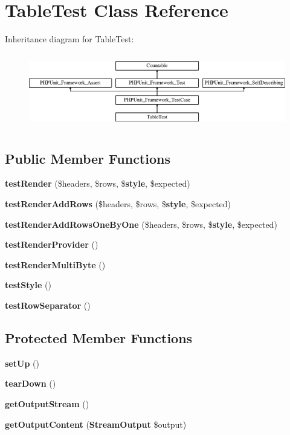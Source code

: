 \section{Table\+Test Class Reference}
\label{class_symfony_1_1_component_1_1_console_1_1_tests_1_1_helper_1_1_table_test}
Inheritance diagram for Table\+Test\+:\begin{figure}[H]
\begin{center}
\leavevmode
\includegraphics[height=3.303835cm]{class_symfony_1_1_component_1_1_console_1_1_tests_1_1_helper_1_1_table_test}
\end{center}
\end{figure}
\subsection*{Public Member Functions}
\begin{DoxyCompactItemize}
\item 
{\bf test\+Render} (\$headers, \$rows, \${\bf style}, \$expected)
\item 
{\bf test\+Render\+Add\+Rows} (\$headers, \$rows, \${\bf style}, \$expected)
\item 
{\bf test\+Render\+Add\+Rows\+One\+By\+One} (\$headers, \$rows, \${\bf style}, \$expected)
\item 
{\bf test\+Render\+Provider} ()
\item 
{\bf test\+Render\+Multi\+Byte} ()
\item 
{\bf test\+Style} ()
\item 
{\bf test\+Row\+Separator} ()
\end{DoxyCompactItemize}
\subsection*{Protected Member Functions}
\begin{DoxyCompactItemize}
\item 
{\bf set\+Up} ()
\item 
{\bf tear\+Down} ()
\item 
{\bf get\+Output\+Stream} ()
\item 
{\bf get\+Output\+Content} ({\bf Stream\+Output} \$output)
\end{DoxyCompactItemize}
